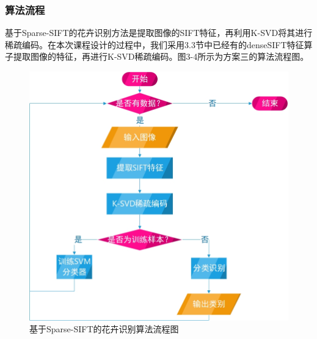 \documentclass[supercite]{HustGraduPaper}
\begin{document}
\begin{sloppypar}
  \subsubsection{算法流程}
  基于Sparse-SIFT的花卉识别方法是提取图像的SIFT特征，再利用K-SVD将其进行稀疏编码。在本次课程设计的过程中，我们采用3.3节中已经有的denseSIFT特征算子提取图像的特征，再进行K-SVD稀疏编码。图3-4所示为方案三的算法流程图。\begin{figure}[H]
    \setlength{\abovecaptionskip}{0.2cm}
    \setlength{\belowcaptionskip}{-0.cm}
      \centering%
      \includegraphics[scale=0.55]{24.jpg}
      \caption{基于Sparse-SIFT的花卉识别算法流程图}
    \end{figure}

\end{sloppypar}
\end{document}
